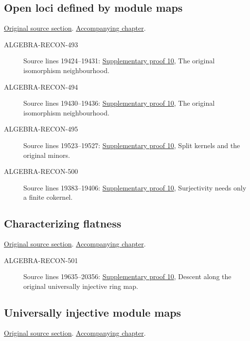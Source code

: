 \subsection{Open loci defined by module maps}
\hypertarget{algebra-source-section-loci-maps}{}
\noindent\href{https://github.com/stacks/stacks-project/blob/a04446e57ec1fbc252a871afcec7752fb2807b14/algebra.tex\#L19375}{Original source section}. \href{algebra.pdf\#nameddest=section-loci-maps}{Accompanying chapter}.

\begin{description}
\item[ALGEBRA-RECON-493] Source lines 19424--19431: \hyperlink{algebra_open_loci_pure_descent_notes_20260927}{Supplementary proof 10}, The original isomorphism neighbourhood.
\item[ALGEBRA-RECON-494] Source lines 19430--19436: \hyperlink{algebra_open_loci_pure_descent_notes_20260927}{Supplementary proof 10}, The original isomorphism neighbourhood.
\item[ALGEBRA-RECON-495] Source lines 19523--19527: \hyperlink{algebra_open_loci_pure_descent_notes_20260927}{Supplementary proof 10}, Split kernels and the original minors.
\item[ALGEBRA-RECON-500] Source lines 19383--19406: \hyperlink{algebra_open_loci_pure_descent_notes_20260927}{Supplementary proof 10}, Surjectivity needs only a finite cokernel.
\end{description}

\subsection{Characterizing flatness}
\hypertarget{algebra-source-section-characterize-flatness}{}
\noindent\href{https://github.com/stacks/stacks-project/blob/a04446e57ec1fbc252a871afcec7752fb2807b14/algebra.tex\#L19583}{Original source section}. \href{algebra.pdf\#nameddest=section-characterize-flatness}{Accompanying chapter}.

\begin{description}
\item[ALGEBRA-RECON-501] Source lines 19635--20356: \hyperlink{algebra_open_loci_pure_descent_notes_20260927}{Supplementary proof 10}, Descent along the original universally injective ring map.
\end{description}

\subsection{Universally injective module maps}
\hypertarget{algebra-source-section-universally-injective}{}
\noindent\href{https://github.com/stacks/stacks-project/blob/a04446e57ec1fbc252a871afcec7752fb2807b14/algebra.tex\#L19742}{Original source section}. \href{algebra.pdf\#nameddest=section-universally-injective}{Accompanying chapter}.

